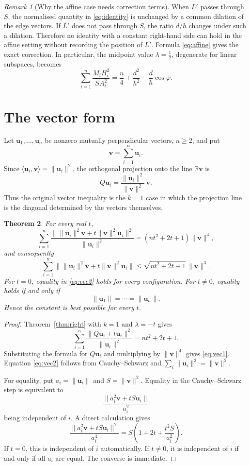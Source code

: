 \documentclass[11pt]{article}
\newtheorem{theorem}{Theorem}[section]
\theoremstyle{definition}
\theoremstyle{remark}
\newtheorem{remark}[theorem]{Remark}
\newcommand{\R}{\mathbb{R}}
\newcommand{\bu}{\mathbf u}
\newcommand{\bv}{\mathbf v}
\newcommand{\norm}[1]{\lVert #1 \rVert}
\begin{document}
\begin{remark}[Why the affine case needs correction terms]\label{rem:noaffine}
When $L'$ passes through $S$, the normalised quantity in \eqref{eq:identity} is unchanged by
a common dilation of the edge vectors. If $L'$ does not pass through $S$, the ratio $d/h$
changes under such a dilation. Therefore no identity with a constant right-hand side can
hold in the affine setting without recording the position of $L'$. Formula
\eqref{eq:affine} gives the exact correction. In particular, the midpoint value
$\lambda=\tfrac12$, degenerate for linear subspaces, becomes
\[
\sum_{i=1}^{n}\frac{M_iH_i^2}{SA_i^2}
=
\frac n4+\frac{d^2}{h^2}-\frac dh\cos\varphi.
\]
\end{remark}

\section{The vector form}\label{sec:vector}

Let $\bu_1,\ldots,\bu_n$ be nonzero mutually perpendicular vectors, $n\ge2$, and put
\[
\bv=\sum_{i=1}^{n}\bu_i.
\]
Since $\langle\bu_i,\bv\rangle=\norm{\bu_i}^2$, the orthogonal projection onto the line
$\R\bv$ is
\[
Q\bu_i=\frac{\norm{\bu_i}^2}{\norm\bv^2}\,\bv.
\]
Thus the original vector inequality is the $k=1$ case in which the projection line is the
diagonal determined by the vectors themselves.

\begin{theorem}\label{thm:vector}
For every real $t$,
\begin{equation}\label{eq:vec1}
\sum_{i=1}^{n}
\frac{\bigl\lVert\norm{\bu_i}^{2}\bv+t\norm\bv^{2}\bu_i\bigr\rVert^{2}}
{\norm{\bu_i}^{2}}
=
(nt^2+2t+1)\norm\bv^4,
\end{equation}
and consequently
\begin{equation}\label{eq:vec2}
\sum_{i=1}^{n}
\bigl\lVert\norm{\bu_i}^{2}\bv+t\norm\bv^{2}\bu_i\bigr\rVert
\le
\sqrt{nt^2+2t+1}\,\norm\bv^3.
\end{equation}
For $t=0$, equality in \eqref{eq:vec2} holds for every configuration. For $t\ne0$, equality
holds if and only if
\[
\norm{\bu_1}=\cdots=\norm{\bu_n}.
\]
Hence the constant is best possible for every $t$.
\end{theorem}

\begin{proof}
Theorem~\ref{thm:right} with $k=1$ and $\lambda=-t$ gives
\[
\sum_{i=1}^{n}\frac{\norm{Q\bu_i+t\bu_i}^2}{\norm{\bu_i}^2}
=nt^2+2t+1.
\]
Substituting the formula for $Q\bu_i$ and multiplying by $\norm\bv^4$ gives
\eqref{eq:vec1}. Equation \eqref{eq:vec2} follows from Cauchy--Schwarz and
$\sum_i\norm{\bu_i}^2=\norm\bv^2$.

For equality, put $a_i=\norm{\bu_i}$ and $S=\norm\bv^2$. Equality in the
Cauchy--Schwarz step is equivalent to
\[
\frac{\bigl\lVert a_i^2\bv+tS\bu_i\bigr\rVert}{a_i^2}
\]
being independent of $i$. A direct calculation gives
\[
\frac{\bigl\lVert a_i^2\bv+tS\bu_i\bigr\rVert^2}{a_i^4}
=
S\left(1+2t+\frac{t^2S}{a_i^2}\right).
\]
If $t=0$, this is independent of $i$ automatically. If $t\ne0$, it is independent of $i$
if and only if all $a_i$ are equal. The converse is immediate.
\end{proof}
\end{document}
